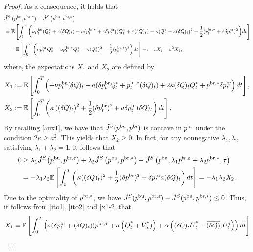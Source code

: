 \documentclass[11pt]{article}
\numberwithin{equation}{section}
\begin{document}
\begin{proof}
As a consequence, it holds that 
{\small\begin{align*}
&\tilde{J}^S\left(p^{{\rm bu}}, p^{{\rm br}, \varepsilon}\right)-\tilde{J}^S\left(p^{{\rm bu}}, p^{{\rm br},*}\right)\nonumber\\
&=\mathbb{E}\left[\int_0^T\bigg(\nu p_t^{{\rm bu}}(Q_t^*+\varepsilon (\delta Q)_t)-a(p_t^{{\rm br},*}+\varepsilon \delta p_t^{{\rm br}})(Q_t^*+\varepsilon (\delta Q)_t)-\kappa(Q_t^*+\varepsilon (\delta Q)_t)^2-\frac{1}{2}(p_t^{{\rm br},*}+\varepsilon \delta p_t^{{\rm br}})^2\bigg)dt\right]\nonumber\\
&\quad-\mathbb{E}\left[\int_0^T\bigg(\nu p_t^{{\rm bu}}Q_t^*-ap_t^{{\rm br},*}Q_t^*-\kappa(Q_t^*)^2-\frac{1}{2}(p_t^{{\rm br},*})^2\bigg)dt\right]=:-\varepsilon X_1-\varepsilon^2 X_2,
\end{align*}}where, the expectations $X_1$ and $X_2$ are defined by
\begin{align}\label{x1-2}
X_1&:=\mathbb{E}\left[\int_0^T\left(-\nu p_t^{{\rm bu}}(\delta Q)_t+a(\delta p_t^{{\rm br}}Q_t^*+p_t^{{\rm br},*}(\delta Q)_t)+2\kappa (\delta Q)_t Q_t^*+p^{{\rm br},*}\delta p_t^{{\rm br}}\right)dt\right],\nonumber\\
X_2&:=\mathbb{E}\left[\int_0^T\left( \kappa\left((\delta Q)_t\right)^2+\frac{1}{2}(\delta p_t^{{\rm br}})^2+a\delta p_t^{{\rm br}}(\delta Q)_t\right)dt\right].
\end{align}
By recalling \eqref{aux1}, we have that $\tilde{J}^S(p^{{\rm bu}}, p^{{\rm br}})$ is concave in $p^{{\rm br}}$ under the condition $ 2\kappa\geq a^2$. This yields that $X_2\geq 0$. In fact, for any nonnegative $\lambda_1,\lambda_2$ satisfying $\lambda_1+\lambda_2=1$, it follows that %
\begin{align*}
0&\geq \lambda_1\tilde{J}^S\left(p^{{\rm bu}}, p^{{\rm br}, \varepsilon}\right)+\lambda_2\tilde{J}^S\left(p^{{\rm bu}}, p^{{\rm br},*}\right)-\tilde{J}^S\left(p^{{\rm bu}}, \lambda_1p^{br, \varepsilon}+\lambda_2p^{{\rm br},*}, \tau\right)\\
&=-\lambda_1\lambda_2\mathbb{E}\left[\int_0^T\left(\kappa((\delta Q)_t)^2+\frac{1}{2}(\delta p^{{\rm br}})^2+\delta p_t^{{\rm br}}a(\delta Q)_t\right)dt\right]=-\lambda_1\lambda_2X_2.
\end{align*}
Due to the optimality of $p^{{\rm br},*}$, we have $\tilde{J}^S(p^{{\rm bu}}, p^{{\rm br}, \varepsilon})-\tilde{J}^S(p^{{\rm bu}}, p^{{\rm br},*})\leq 0$. Thus, it follows from \eqref{ito1}, \eqref{ito2} and \eqref{x1-2} that
\begin{align*}
X_1&=\mathbb{E}\left[\int_0^T\left(a(\delta p_t^{{\rm br}}+(\delta Q)_t)(p^{{\rm br},*}+a\left( \overline{Q}_t^*+ \overline{V}_t^*)\right)+\alpha \left((\delta Q)_t\overline{U}_t^*-\overline{(\delta Q)}_tU_t^*\right)\right)dt\right]\\

\end{align*}
\end{proof}
\end{document}
